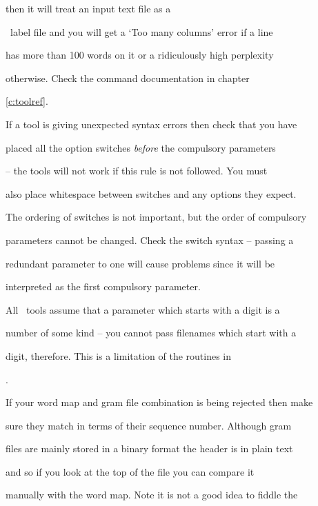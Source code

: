 then it will treat an input text file as a


\HTK\ label file and you will get a `Too many columns' error if a line


has more than 100 words on it or a ridiculously high perplexity


otherwise.  Check the command documentation in chapter


\ref{c:toolref}.







If a tool is giving unexpected syntax errors then check that you have


placed all the option switches {\it before} the compulsory parameters


-- the tools will not work if this rule is not followed.  You must


also place whitespace between switches and any options they expect.


The ordering of switches is not important, but the order of compulsory


parameters cannot be changed.  Check the switch syntax -- passing a


redundant parameter to one will cause problems since it will be


interpreted as the first compulsory parameter.





All \HTK\ tools assume that a parameter which starts with a digit is a


number of some kind -- you cannot pass filenames which start with a


digit, therefore.  This is a limitation of the routines in


. 







If your word map and gram file combination is being rejected then make


sure they match in terms of their sequence number.  Although gram


files are mainly stored in a binary format the header is in plain text


and so if you look at the top of the file you can compare it


manually with the word map.  Note it is not a good idea to fiddle the


